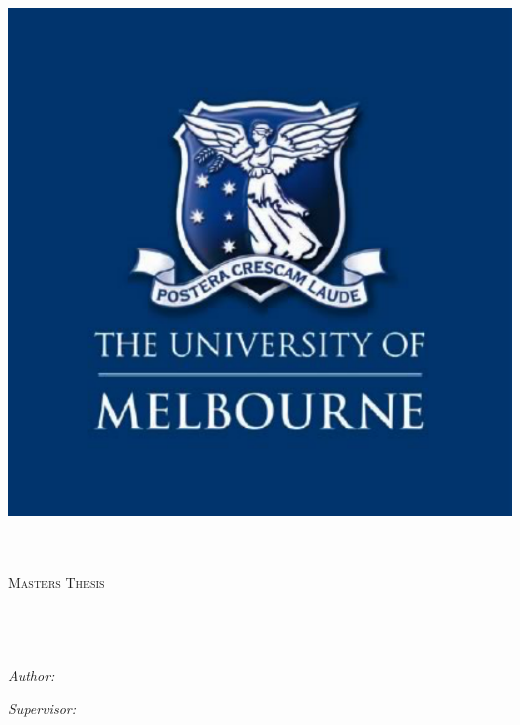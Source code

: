 \documentclass[11pt, oneside]{Thesis}
\begin{document}
\begin{titlepage}
\begin{center}
\includegraphics[scale=0.3]{unilogo.pdf} %

\textsc{\LARGE \deptname}\\ %
\textsc{\LARGE \univname}\\[1.5cm] %
\textsc{\Large Masters Thesis}\\[0.5cm] %

\HRule \\[0.4cm] %
{\huge \bfseries \ttitle}\\[0.4cm] %
\HRule \\[1.5cm] %

\begin{minipage}{0.4\textwidth}
\begin{flushleft} \large
\emph{Author:}\\
\href{http://www.rabipanda.com}{\authornames}
\end{flushleft}
\end{minipage}
\begin{minipage}{0.4\textwidth}
\begin{flushright} \large
\emph{Supervisor:} \\
\href{http://www.cis.unimelb.edu.au/people/staff.php?person_ID=618008}{\supname}
\end{flushright}
\end{minipage}\\[3cm]


\end{center}
\end{titlepage}
\end{document}

